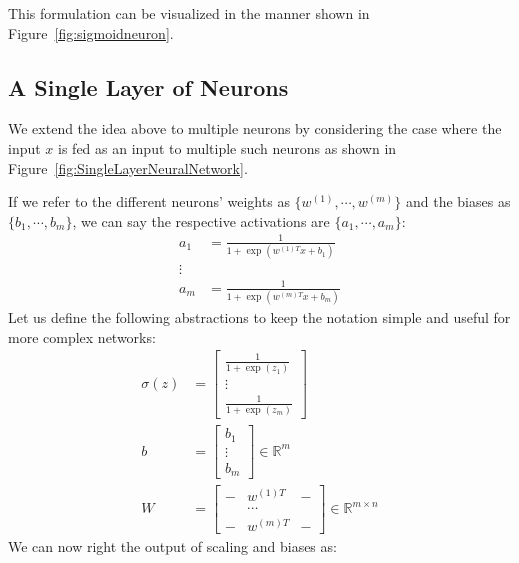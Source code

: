 \documentclass{tufte-handout}
\begin{document}
This formulation can be visualized in the manner shown in Figure~\ref{fig:sigmoidneuron}.

\subsection{A Single Layer of Neurons}\label{sec:neuronlayer}

We extend the idea above to multiple neurons by considering the case where the input $x$ is fed as an input to multiple such neurons as shown in Figure~\ref{fig:SingleLayerNeuralNetwork}. 

If we refer to the different neurons' weights as $\{w^{(1)}, \cdots, w^{(m)}\}$ and the biases as $\{b_1, \cdots, b_m\}$, we can say the respective activations are  $\{a_1, \cdots, a_m\}$:
\begin{align*}
a_1 &= \frac{1}{1 + \exp(w^{(1)T}x + b_1)}\\
\vdots \\
a_m &= \frac{1}{1 + \exp(w^{(m)T}x + b_m)}
\end{align*}
Let us define the following abstractions to keep the notation simple and useful for more complex networks:
\begin{align*}
\sigma(z) &= \begin{bmatrix}  \frac{1}{1 + \exp(z_1)}\\ \vdots \\  \frac{1}{1 + \exp(z_m)}\end{bmatrix}\\
b &= \begin{bmatrix}  b_1\\ \vdots \\  b_m \end{bmatrix} \in \mathbb{R}^{m}\\
W &= \begin{bmatrix} - & w^{(1)T} & -\\ & \cdots & \\ - & w^{(m)T} & - \end{bmatrix} \in \mathbb{R}^{m\times n}
\end{align*}
We can now right the output of scaling and biases as:
\end{document}
